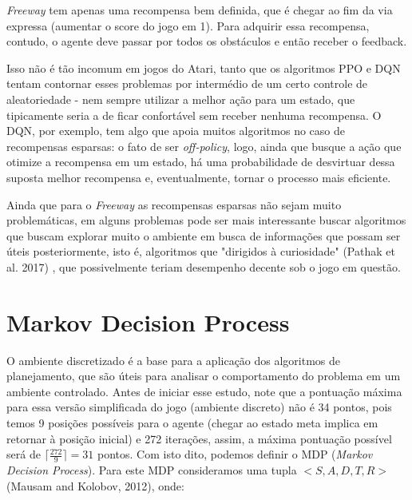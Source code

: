 \documentclass[letterpaper]{article} %
\begin{document}
\textit{Freeway} tem apenas uma recompensa bem definida, que é chegar ao fim da via expressa (aumentar o score do jogo em 1). Para adquirir essa recompensa, contudo, o agente deve passar por todos os obstáculos e então receber o feedback.

Isso não é tão incomum em jogos do Atari, tanto que os algoritmos PPO e DQN tentam contornar esses problemas por intermédio de um certo controle de aleatoriedade - nem sempre utilizar a melhor ação para um estado, que tipicamente seria a de ficar confortável sem receber nenhuma recompensa. O DQN, por exemplo, tem algo que apoia muitos algoritmos no caso de recompensas esparsas: o fato de ser \textit{off-policy}, logo, ainda que busque a ação que otimize a recompensa em um estado, há uma probabilidade de desvirtuar dessa suposta melhor recompensa e, eventualmente, tornar o processo mais eficiente.

Ainda que para o \textit{Freeway} as recompensas esparsas não sejam muito problemáticas, em alguns problemas pode ser mais interessante buscar algoritmos que buscam explorar muito o ambiente em busca de informações que possam ser úteis posteriormente, isto é, algoritmos que "dirigidos à curiosidade" (Pathak et al. 2017) , que possivelmente teriam desempenho decente sob o jogo em questão.

\section{Markov Decision Process}
O ambiente discretizado é a base para a aplicação dos algoritmos de planejamento, que são úteis para analisar o comportamento do problema em um ambiente controlado. Antes de iniciar esse estudo, note que a pontuação máxima para essa versão simplificada do jogo (ambiente discreto) não é 34 pontos, pois temos 9 posições possíveis para o agente (chegar ao estado meta implica em retornar à posição inicial) e 272 iterações, assim, a máxima pontuação possível será de $\lceil \frac{272}{9}\rceil = 31$ pontos. Com isto dito, podemos definir o MDP (\textit{Markov Decision Process}). Para este MDP consideramos uma tupla $<S,A,D,T,R>$ (Mausam and Kolobov, 2012), onde: 
\end{document}
